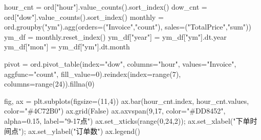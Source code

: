 \documentclass[
]{ctexart}
\newenvironment{Shaded}{\begin{snugshade}}{\end{snugshade}}
\newcommand{\BuiltInTok}[1]{\textcolor[rgb]{0.00,0.23,0.31}{#1}}
\newcommand{\DecValTok}[1]{\textcolor[rgb]{0.68,0.00,0.00}{#1}}
\newcommand{\FloatTok}[1]{\textcolor[rgb]{0.68,0.00,0.00}{#1}}
\newcommand{\NormalTok}[1]{\textcolor[rgb]{0.00,0.23,0.31}{#1}}
\newcommand{\OperatorTok}[1]{\textcolor[rgb]{0.37,0.37,0.37}{#1}}
\newcommand{\StringTok}[1]{\textcolor[rgb]{0.13,0.47,0.30}{#1}}
\newcommand{\VariableTok}[1]{\textcolor[rgb]{0.07,0.07,0.07}{#1}}
\begin{document}
\begin{Shaded}
\begin{Highlighting}[]
\NormalTok{hour\_cnt }\OperatorTok{=} \BuiltInTok{ord}\NormalTok{[}\StringTok{"hour"}\NormalTok{].value\_counts().sort\_index()}
\NormalTok{dow\_cnt }\OperatorTok{=} \BuiltInTok{ord}\NormalTok{[}\StringTok{"dow"}\NormalTok{].value\_counts().sort\_index()}
\NormalTok{monthly }\OperatorTok{=} \BuiltInTok{ord}\NormalTok{.groupby(}\StringTok{"ym"}\NormalTok{).agg(orders}\OperatorTok{=}\NormalTok{(}\StringTok{"Invoice"}\NormalTok{,}\StringTok{"count"}\NormalTok{), sales}\OperatorTok{=}\NormalTok{(}\StringTok{"TotalPrice"}\NormalTok{,}\StringTok{"sum"}\NormalTok{))}
\NormalTok{ym\_df }\OperatorTok{=}\NormalTok{ monthly.reset\_index()}
\NormalTok{ym\_df[}\StringTok{"year"}\NormalTok{] }\OperatorTok{=}\NormalTok{ ym\_df[}\StringTok{"ym"}\NormalTok{].dt.year}
\NormalTok{ym\_df[}\StringTok{"mon"}\NormalTok{] }\OperatorTok{=}\NormalTok{ ym\_df[}\StringTok{"ym"}\NormalTok{].dt.month}


\NormalTok{pivot }\OperatorTok{=} \BuiltInTok{ord}\NormalTok{.pivot\_table(index}\OperatorTok{=}\StringTok{"dow"}\NormalTok{, columns}\OperatorTok{=}\StringTok{"hour"}\NormalTok{, values}\OperatorTok{=}\StringTok{"Invoice"}\NormalTok{, aggfunc}\OperatorTok{=}\StringTok{"count"}\NormalTok{,}
\NormalTok{                        fill\_value}\OperatorTok{=}\DecValTok{0}\NormalTok{).reindex(index}\OperatorTok{=}\BuiltInTok{range}\NormalTok{(}\DecValTok{7}\NormalTok{), columns}\OperatorTok{=}\BuiltInTok{range}\NormalTok{(}\DecValTok{24}\NormalTok{)).fillna(}\DecValTok{0}\NormalTok{)}
\end{Highlighting}
\end{Shaded}

\begin{Shaded}
\begin{Highlighting}[]
\NormalTok{fig, ax }\OperatorTok{=}\NormalTok{ plt.subplots(figsize}\OperatorTok{=}\NormalTok{(}\DecValTok{11}\NormalTok{,}\DecValTok{4}\NormalTok{))}
\NormalTok{ax.bar(hour\_cnt.index, hour\_cnt.values, color}\OperatorTok{=}\StringTok{"\#4C72B0"}\NormalTok{)}
\NormalTok{ax.grid(}\VariableTok{False}\NormalTok{) }
\NormalTok{ax.axvspan(}\DecValTok{9}\NormalTok{,}\DecValTok{17}\NormalTok{, color}\OperatorTok{=}\StringTok{"\#DD8452"}\NormalTok{, alpha}\OperatorTok{=}\FloatTok{0.15}\NormalTok{, label}\OperatorTok{=}\StringTok{"9{-}17点"}\NormalTok{)}
\NormalTok{ax.set\_xticks(}\BuiltInTok{range}\NormalTok{(}\DecValTok{0}\NormalTok{,}\DecValTok{24}\NormalTok{,}\DecValTok{2}\NormalTok{))}\OperatorTok{;}\NormalTok{ ax.set\_xlabel(}\StringTok{"下单时间点"}\NormalTok{)}\OperatorTok{;}\NormalTok{ ax.set\_ylabel(}\StringTok{"订单数"}\NormalTok{)}
\NormalTok{ax.legend()}
\end{Highlighting}
\end{Shaded}
\end{document}
